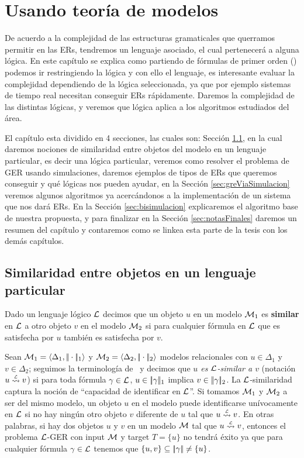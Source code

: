 \chapter{Usando teor\'ia de modelos}
\label{sec:intro_logica}

De acuerdo a la complejidad de las estructuras gramaticales que querramos permitir en las ERs, tendremos un lenguaje asociado, 
el cual pertenecer\'a a alguna l\'ogica. En este cap\'itulo se explica como partiendo de f\'ormulas de primer orden (\FOL) 
podemos ir restringiendo la l\'ogica y con ello el lenguaje, es interesante evaluar la complejidad dependiendo de la l\'ogica seleccionada, 
ya que por ejemplo sistemas de tiempo real necesitan conseguir ERs r\'apidamente. Daremos la complejidad de las distintas l\'ogicas, 
y veremos que l\'ogica aplica a los algoritmos estudiados del \'area.

El cap\'itulo esta dividido en 4 secciones, las cuales son: Secci\'on \ref{sec:seleccionandoLenguaje}, en la cual daremos nociones de similaridad entre objetos del modelo en un lenguaje particular, es decir una l\'ogica particular, veremos como resolver el problema de GER usando simulaciones, daremos ejemplos 
de tipos de ERs que queremos conseguir y qu\'e l\'ogicas nos pueden ayudar, en la Secci\'on \ref{sec:greViaSimulacion} veremos 
algunos algoritmos ya acerc\'andonos a la implementaci\'on de un sistema que nos dar\'a ERs. En la Secci\'on \ref{sec:bisimulacion} 
explicaremos el algoritmo base de nuestra propuesta, y para finalizar en la Secci\'on \ref{sec:notasFinales} daremos un resumen del cap\'itulo y contaremos como se linkea esta parte de la tesis con los dem\'as cap\'itulos.


\section{Similaridad entre objetos en un lenguaje particular}
\label{sec:seleccionandoLenguaje}

Dado un lenguaje l\'ogico $\mathcal{L}$ decimos que un objeto $u$ en un modelo
$\mathcal{M}_1$ es {\bf similar} en $\mathcal{L}$ a otro objeto
 $v$ en el modelo $\mathcal{M}_2$ si para cualquier f\'ormula en $\mathcal{L}$ que es satisfecha por $u$ tambi\'en es satisfecha por $v$. 

Sean $\mathcal{M}_1 = \langle \Delta_1, |\!|\cdot|\!|_1 \rangle$ y $\mathcal{M}_2 = \langle \Delta_2, |\!|\cdot|\!|_2 \rangle$ modelos relacionales con $u \in \Delta_1$ y $v \in \Delta_2$; seguimos la terminolog\'ia de~\cite{areces08} y decimos que
\emph{$u$ es $\mathcal{L}$-similar a $v$}  (notaci\'on $u \simil{\+L} v$) si para toda f\'ormula $\gamma \in \mathcal{L}$, $u \in |\!|\gamma|\!|_1$ implica
$v \in |\!|\gamma|\!|_2$. 
La $\mathcal{L}$-similaridad captura la noci\'on de ``capacidad de identificar en $\mathcal{L}$''. Si tomamos $\mathcal{M}_1$ y $\mathcal{M}_2$ a ser del 
mismo modelo, un objeto $u$ en el modelo puede identificarse un\'ivocamente en $\mathcal{L}$ si no hay ning\'un otro objeto $v$ diferente de $u$ 
tal que $u \simil{\+L} v$. En otras palabras, si hay dos objetos $u$ y $v$ en un modelo $\mathcal{M}$  tal que
$u \simil{\+L} v$, entonces el problema $\mathcal{L}$-GER con input $\mathcal{M}$ y target $T=\{u\}$ no tendr\'a \'exito ya que para cualquier 
f\'ormula $\gamma \in \mathcal{L}$ tenemos que $\{u,v\} \subseteq |\!|\gamma|\!| \not = \{u\}$.

